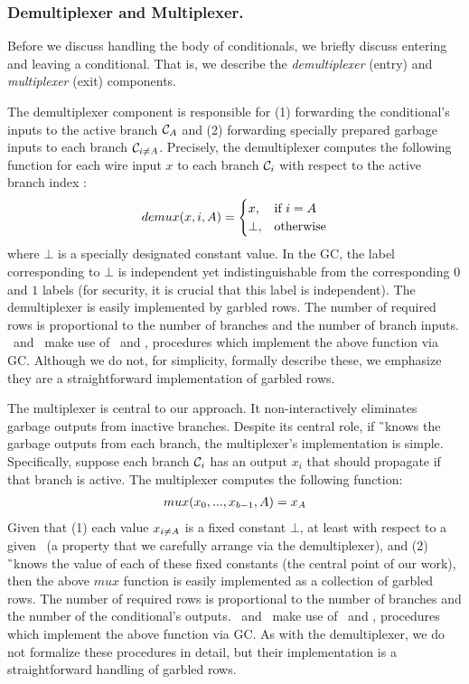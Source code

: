 \subsubsection{Demultiplexer and Multiplexer.}

Before we discuss handling the body of conditionals, we briefly discuss
entering and leaving a conditional.
%
That is, we describe the \emph{demultiplexer} (entry) and
\emph{multiplexer} (exit) components.

The demultiplexer component is responsible for (1) forwarding the
conditional's inputs to the active branch $\mathcal C_{A}$ and (2)
forwarding specially prepared garbage inputs to each branch $\mathcal C_{i \neq A}$.
Precisely, the demultiplexer computes the following function for
each wire input $x$ to each branch $\mathcal C_i$ with respect to the active
branch index \aid:
\begin{align*}
demux(x, i, A) =
   \begin{cases}
     x,& \text{if $i = A$}\\
     \bot, &\text{otherwise}
   \end{cases}
\end{align*}
where $\bot$ is a specially designated constant value.
In the GC, the label corresponding to $\bot$ is independent yet
indistinguishable from the corresponding $0$ and $1$ labels (for
security, it is crucial that this label is independent).
The demultiplexer is easily implemented by garbled rows.
The number of required rows is proportional to the number of branches
and the number of branch inputs.
%
\evcond\ and \gbcond\ make use of \evdem\ and \gbdem, procedures which
implement the above function via GC.
Although we do not, for simplicity, formally describe these, we
emphasize they are a straightforward implementation of garbled rows.

The multiplexer is central to our approach.
It non-interactively eliminates garbage outputs from inactive
branches.
%
Despite its central role, if \G\ knows the garbage
outputs from each branch, the multiplexer's implementation is simple.
%
Specifically, suppose each branch $\mathcal C_i$ has an output $x_i$ that
should propagate if that branch is active.
The multiplexer computes the following function:
\begin{align*}
  mux(x_0, ..., x_{b-1}, A) = x_{A}
\end{align*}
Given that (1) each value $x_{i\neq A}$ is a fixed constant $\bot$, at
least with respect to a given \aid\ (a
property that we carefully arrange via the demultiplexer), and (2) \G\
knows the value of each of these fixed constants (the central point of
our work), then the above $mux$ function is easily implemented as a
collection of garbled rows.
The number of required rows is proportional to the number of branches
and the number of the conditional's outputs.
\evcond\ and \gbcond\ make use of \evmux\ and \gbmux, procedures which
implement the above function via GC.
As with the demultiplexer, we do not formalize these procedures in
detail, but their implementation is a straightforward handling of
garbled rows.

